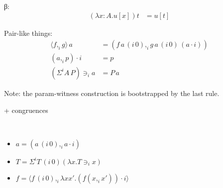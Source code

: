 \documentclass[english]{PaperTools/latex/lipics}
\newcommand\CP[3]{(#2,_{#1} #3)}
\newcommand\CSig[1]{\Sigma^{#1}}
\newcommand\param[1]{\!\cdot\!#1}
\newcommand\op[1]{∋_{#1}}
\newcommand\ip[3]{Σ^{#1} {#2}\,{#3}}
\newcommand\fp[3]{⟨#2 ,_{#1} #3⟩}
\newcommand\mor[2]{({#1}\,{#2})}
\newcommand\proj[2]{{#2}\,\mor{#1}0}
\newcommand\comment[1]{}
\begin{document}
\comment{
\begin{definition}[Normal forms and neutral terms]~
  \begin{align*}
    \mathsf{Nf} ∋ u,v,A,B & \coloneqq
      U \mid λx:A. t \mid (x:A) → B \\
      & \mid \CP i u v \mid \fp i u v \\
      & \mid {(\ip {i₀} A B)} \op {i₁} {u_1 \cdots} \op {i_n} {u_n} &\quad \text{($i₀ \prec i₁ \prec \ldots \prec i_n$)} \\
      & \mid s \param {i₀} \cdots \param {i_{n-1}}                  &\quad \text{($i₀ \prec   < \ldots \prec i_{n-1}$)}
    \\
    \mathsf{Ne} ∋ s & \coloneqq x \mid s \, u
  \end{align*}
\end{definition}
}

\begin{definition}[Conversion]~
\label{def:conversion}

β:
\begin{align*}
  (λx:A. u[x]) t &= u[t]
\end{align*}

Pair-like things:
\begin{align*}
  {\fp i f g} \, a      &= (f\,{\proj i a} ,_i g\,{\proj i a}\,{(a \param i)}) \\
  {(a,_i p)} \param i   &= p \\
  {(\ip i A P)} \op i a &= P\,a
\end{align*}

Note: the param-witness construction is bootstrapped by the last rule.

  + congruences
\end{definition}

\begin{corollary}~
  \label{cor:equalities}
  \begin{itemize}
  \item $a = \CP i {\proj i a} {a \param i}$
  \item $T = \CSig i {\proj i T} {(λx. T \op i x)}$
  \item $f = \fp i {\proj i f} {λx x'. (f \CP i x {x'}) \param i}$
  \end{itemize}
\end{corollary}
\end{document}
